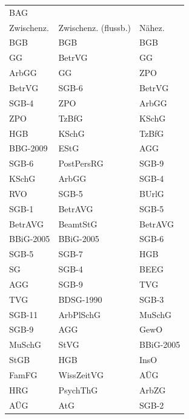 \begin{tabular}{lll}
\toprule
\multicolumn{4}{l}{BAG} \\
Zwischenz. & Zwischenz. (flussb.) &    Nähez. \\
\midrule
       BGB &                  BGB &       BGB \\
        GG &               BetrVG &        GG \\
     ArbGG &                   GG &       ZPO \\
    BetrVG &                SGB-6 &    BetrVG \\
     SGB-4 &                  ZPO &     ArbGG \\
       ZPO &                TzBfG &     KSchG \\
       HGB &                KSchG &     TzBfG \\
  BBG-2009 &                 EStG &       AGG \\
     SGB-6 &           PostPersRG &     SGB-9 \\
     KSchG &                ArbGG &     SGB-4 \\
       RVO &                SGB-5 &     BUrlG \\
     SGB-1 &              BetrAVG &     SGB-5 \\
   BetrAVG &             BeamtStG &   BetrAVG \\
 BBiG-2005 &            BBiG-2005 &     SGB-6 \\
     SGB-5 &                SGB-7 &       HGB \\
        SG &                SGB-4 &      BEEG \\
       AGG &                SGB-9 &       TVG \\
       TVG &            BDSG-1990 &     SGB-3 \\
    SGB-11 &            ArbPlSchG &    MuSchG \\
     SGB-9 &                  AGG &      GewO \\
    MuSchG &                 StVG & BBiG-2005 \\
      StGB &                  HGB &      InsO \\
     FamFG &           WissZeitVG &       AÜG \\
       HRG &             PsychThG &     ArbZG \\
       AÜG &                  AtG &     SGB-2 \\
\bottomrule
\end{tabular}

